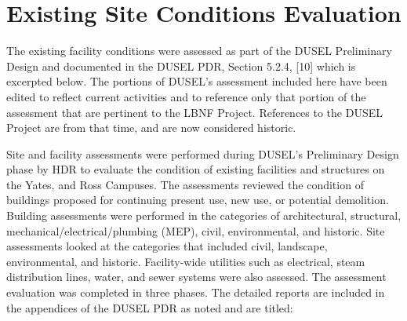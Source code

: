 \section{Existing  Site Conditions Evaluation}
\label{sec:fscf-site-cond-eval}

The existing facility conditions were assessed as part of the DUSEL Preliminary Design and documented in the DUSEL PDR, Section 5.2.4, [10] which is excerpted below. The portions of DUSEL's assessment included here have been edited to reflect current activities and to reference only that portion of the assessment that are pertinent to the LBNF Project. References to the DUSEL Project are from that time, and are now considered historic.

Site and facility assessments were performed during DUSEL's Preliminary Design phase by HDR to evaluate the condition of existing facilities and structures on the Yates, and Ross Campuses. The assessments reviewed the condition of buildings proposed for continuing present use, new use, or potential demolition. Building assessments were performed in the categories of architectural, structural, mechanical/electrical/plumbing (MEP), civil, environmental, and historic. Site assessments looked at the categories that included civil, landscape, environmental, and historic. Facility-wide utilities such as electrical, steam distribution lines, water, and sewer systems were also assessed. The assessment evaluation was completed in three phases. The detailed reports are included in the appendices of the DUSEL PDR as noted and are titled:

